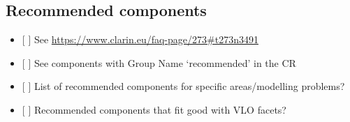 \subsection{Recommended components}\label{recommended-components}

\begin{itemize}
\tightlist
\item
  {[} {]} See \url{https://www.clarin.eu/faq-page/273\#t273n3491}
\item
  {[} {]} See components with Group Name `recommended' in the CR
\item
  {[} {]} List of recommended components for specific areas/modelling
  problems?
\item
  {[} {]} Recommended components that fit good with VLO facets?
\end{itemize}
